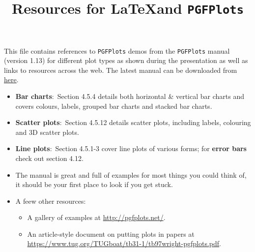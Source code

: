 \documentclass[a4paper]{article}
\title{Resources for \LaTeX and \texttt{PGFPlots}}
\begin{document}
    \maketitle
    This file contains references to \texttt{PGFPlots} demos from the \texttt{PGFPlots} manual (version 1.13) for different plot types as shown during the presentation as well as links to resources across the web. The latest manual can be downloaded from \href{http://pgfplots.sourceforge.net/pgfplots.pdf}{here}.\\

    \begin{itemize}
        \item \textbf{Bar charts}:~Section 4.5.4 details both horizontal \& vertical bar charts and covers colours, labels, grouped bar charts and stacked bar charts.\\
        \item \textbf{Scatter plots}:~Section 4.5.12 details scatter plots, including labels, colouring and 3D scatter plots.\\
        \item \textbf{Line plots}:~Section 4.5.1-3 cover line plots of various forms; for \textbf{error bars} check out section 4.12.\\
        \item The manual is great and full of examples for most things you could think of, it should be your first place to look if you get stuck.
        \\
        \item A feew other resources:
        \begin{itemize}
            \item A gallery of examples at \url{http://pgfplots.net/}.\\
            \item An article-style document on putting plots in papers at \url{https://www.tug.org/TUGboat/tb31-1/tb97wright-pgfplots.pdf}.\\
        \end{itemize}
    \end{itemize}
\end{document}
